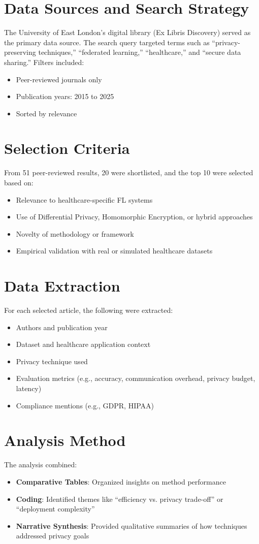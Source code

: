 \documentclass[12pt]{report}
\begin{document}
\section{Data Sources and Search Strategy}
The University of East London’s digital library (Ex Libris Discovery) served as the primary data source. The search query targeted terms such as ``privacy-preserving techniques,'' ``federated learning,'' ``healthcare,'' and ``secure data sharing.'' Filters included:
\begin{itemize}
    \item Peer-reviewed journals only
    \item Publication years: 2015 to 2025
    \item Sorted by relevance
\end{itemize}

\section{Selection Criteria}
From 51 peer-reviewed results, 20 were shortlisted, and the top 10 were selected based on:
\begin{itemize}
    \item Relevance to healthcare-specific FL systems
    \item Use of Differential Privacy, Homomorphic Encryption, or hybrid approaches
    \item Novelty of methodology or framework
    \item Empirical validation with real or simulated healthcare datasets
\end{itemize}

\section{Data Extraction}
For each selected article, the following were extracted:
\begin{itemize}
    \item Authors and publication year
    \item Dataset and healthcare application context
    \item Privacy technique used
    \item Evaluation metrics (e.g., accuracy, communication overhead, privacy budget, latency)
    \item Compliance mentions (e.g., GDPR, HIPAA)
\end{itemize}

\section{Analysis Method}
The analysis combined:
\begin{itemize}
    \item \textbf{Comparative Tables}: Organized insights on method performance
    \item \textbf{Coding}: Identified themes like ``efficiency vs. privacy trade-off'' or ``deployment complexity''
    \item \textbf{Narrative Synthesis}: Provided qualitative summaries of how techniques addressed privacy goals
\end{itemize}
\end{document}
